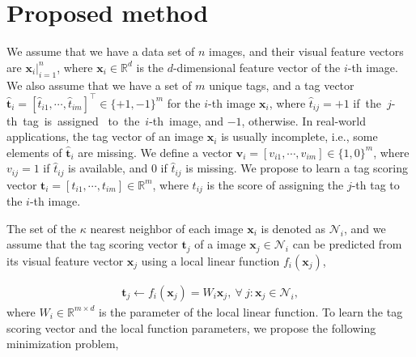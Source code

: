 \documentclass[runningheads,a4paper]{llncs}
\newcommand{\bfx}{{\textbf{x}}}
\newcommand{\bfv}{{\textbf{v}}}
\newcommand{\bft}{{\textbf{t}}}
\begin{document}
\section{Proposed method}
\label{sec:method}


We assume that we have a data set of $n$ images, and their visual feature vectors are $\bfx_i|_{i=1}^n$, where $\bfx_i \in \mathbb{R}^d$ is the $d$-dimensional feature vector of the $i$-th image. We also assume that we have a set of $m$ unique tags, and a tag vector $\widehat{\bft}_i =[\widehat{t}_{i1},\cdots, \widehat{t}_{im}]^\top \in \{+1,-1\}^m$ for the $i$-th image $\bfx_i$, where
$\widehat{t}_{ij} =
+1$ if~the~$j$-th~tag~is~assigned ~to~the~$i$-th~image, and $-1$, otherwise. In real-world applications, the tag vector of an image $\bfx_i$ is usually incomplete, i.e., some elements of $\widehat{\bft}_i$ are missing. We define a vector $\bfv_i = [v_{i1},\cdots,v_{im}]\in \{1,0\}^m$, where $v_{ij} = 1$ if $\widehat{t}_{ij}$ is available, and $0$ if $\widehat{t}_{ij}$ is missing. We propose to learn a tag scoring vector $\bft_i = [t_{i1}, \cdots,t_{im}]\in \mathbb{R}^m$, where $t_{ij}$ is the score of assigning the $j$-th tag to the $i$-th image.

The set of the $\kappa$ nearest neighbor of each image $\bfx_i$ is denoted as $\mathcal{N}_i$, and we assume that the tag scoring vector $\bft_j$ of a image $\bfx_j \in \mathcal{N}_i$ can be predicted from its visual feature vector $\bfx_j$ using a local linear function $f_i(\bfx_j)$,

\begin{equation}
\begin{aligned}
\bft_j  \leftarrow f_i(\bfx_j)=W_i \bfx_j , ~\forall~j:\bfx_j\in \mathcal{N}_i,
\end{aligned}
\end{equation}
where $W_i\in \mathbb{R}^{m\times d}$ is the parameter of the local linear function. To learn the tag scoring vector and the local function parameters, we propose the following minimization problem,
\end{document}
